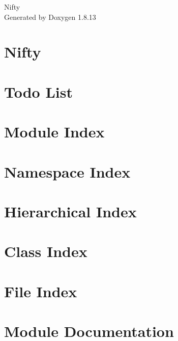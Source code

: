 \documentclass[twoside]{book}
\newcommand{\+}{\discretionary{\mbox{\scriptsize$\hookleftarrow$}}{}{}}
\newcommand{\clearemptydoublepage}{%
  \newpage{\pagestyle{empty}\cleardoublepage}%
}
\begin{document}
\hypersetup{pageanchor=false,
             bookmarksnumbered=true,
             pdfencoding=unicode
            }
\begin{titlepage}
\vspace*{7cm}
\begin{center}%
{\Large Nifty }\\
\vspace*{1cm}
{\large Generated by Doxygen 1.8.13}\\
\end{center}
\end{titlepage}
\clearemptydoublepage
{}
\tableofcontents
\clearemptydoublepage
{}
\hypersetup{pageanchor=true}

\chapter{Nifty}
\label{index}\hypertarget{index}{}
\chapter{Todo List}
\label{todo}

\chapter{Module Index}

\chapter{Namespace Index}

\chapter{Hierarchical Index}

\chapter{Class Index}

\chapter{File Index}

\chapter{Module Documentation}











\end{document}
